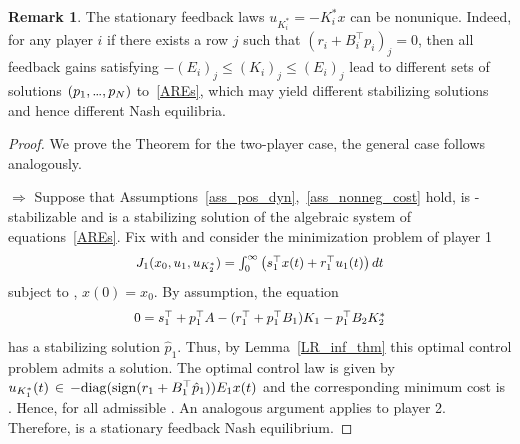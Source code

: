 \documentclass[letterpaper, 10 pt, conference]{ieeeconf}
\newcommand\mydots{\hbox to 0.7em{.\hss.\hss.}}
\theoremstyle{definition}
\newtheorem{rem}{Remark}
\begin{document}
\begin{rem} \label{nonuniqueStat}
   The stationary feedback laws $ u_{K_i^*}=-K^*_i x$ can be nonunique. Indeed, for any player $i$ if there exists a row $j$ such that $(r_i+B_i^{\top}p_i)_j =0$, then  all feedback gains satisfying $-(E_i)_j\leq (K_i)_j\leq (E_i)_j$ lead to different sets of  solutions $(p_1, \mydots, p_N)$ to~\eqref{AREs}, which may yield different stabilizing solutions and hence different Nash equilibria. 
\end{rem}
\begin{proof}
We prove the Theorem for the two-player case, the general case follows analogously.

$\Longrightarrow$ Suppose that Assumptions~\ref{ass_pos_dyn},~\ref{ass_nonneg_cost} hold, \scalebox{.94}{$(A, B_1, \mydots, B_N)$} is \scalebox{.94}{$(E_1,\mydots, E_N)$}-stabilizable and  is a stabilizing solution of the algebraic system of equations~\eqref{AREs}. Fix  with  and consider the minimization problem of player 1
\begin{align*}
    \scalebox{.94}{$J_1(x_0, u_1, u_{K_2^*})=\int_0^{\infty} \left( s^{\top}_1 x(t)+ r^{\top}_1 u_1(t) \right)dt$}
\end{align*}
subject to  , $x(0)=x_0$. By assumption, the equation  
\begin{align*}
    \scalebox{.94}{$0=s_1^{\top}+ p^{\top}_1A-(r_1^{\top}+ p^{\top}_1B_1)K_1-p^{\top}_1B_2 K^*_2$}
\end{align*}
has a stabilizing
solution $\hat p_1$. Thus, by Lemma~\ref{LR_inf_thm} this optimal control problem admits a solution. The optimal control law is given by $u_{K_1^*}(t)\hspace{0.5mm} \in \hspace{0.5mm} -\mathrm{diag}(\mathrm{sign}(r_1+ B_1^{\top}\hat p_1))E_1x(t)$ and the corresponding minimum cost is . Hence, for all admissible . An analogous argument applies to player 2. Therefore,  is a stationary feedback Nash equilibrium.


\end{proof}
\end{document}
